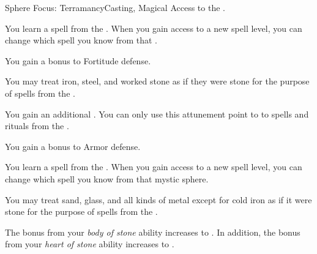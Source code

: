    \begin{feat}{Sphere Focus: Terramancy}{Casting, Magical}
        \featpre Access to the  .

         You learn a spell from the  .
        When you gain access to a new spell level, you can change which spell you know from that .

         You gain a  bonus to Fortitude defense.

         You may treat iron, steel, and worked stone as if they were stone for the purpose of spells from the  .

         You gain an additional .
        You can only use this attunement point to  to spells and rituals from the  .

         You gain a  bonus to Armor defense.

         You learn a spell from the  .
        When you gain access to a new spell level, you can change which spell you know from that mystic sphere.

         You may treat sand, glass, and all kinds of metal except for cold iron as if it were stone for the purpose of spells from the  .

         The bonus from your \textit{body of stone} ability increases to .
        In addition, the bonus from your \textit{heart of stone} ability increases to .
    \end{feat}

